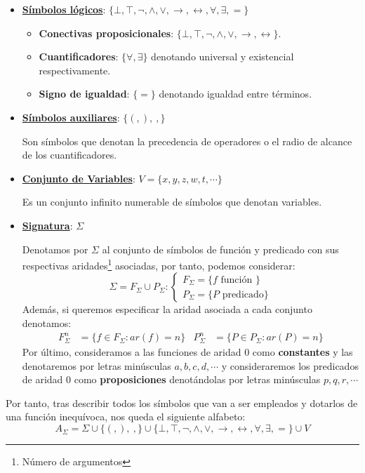 \documentclass[10pt,a4paper,openright]{book}
\begin{document}
\begin{itemize}
\item \underline{\textbf{Símbolos lógicos}}: $\{\bot, \top, \neg, \wedge, \vee, \rightarrow, \leftrightarrow, \forall, \exists, =\}$
	\begin{itemize}
	\item \textbf{Conectivas proposicionales}: $\{\bot, \top, \neg, \wedge, \vee, \rightarrow, \leftrightarrow\}$.
	\item \textbf{Cuantificadores}: $\{\forall, \exists\}$ denotando universal y existencial respectivamente.
	\item \textbf{Signo de igualdad}: $\{=\}$ denotando igualdad entre términos.
	\end{itemize}
\item \underline{\textbf{Símbolos auxiliares}}: $\{(, ), \ ,\}$

Son símbolos que denotan la precedencia de operadores o el radio de alcance de los cuantificadores.

\item \underline{\textbf{Conjunto de Variables}}: $V=\{x,y,z,w,t, \cdots\}$

Es un conjunto infinito numerable de símbolos que denotan variables.

\item \underline{\textbf{Signatura}}: $\Sigma$

Denotamos por $\Sigma$ al conjunto de símbolos de función y predicado con sus respectivas aridades\footnote{Número de argumentos} asociadas, por tanto, podemos considerar:
$$\Sigma = F_\Sigma \cup P_\Sigma: \begin{cases} F_\Sigma = \{f \mbox{ función }\} \\ P_\Sigma = \{P \mbox{ predicado}\}\end{cases}$$
Además, si queremos especificar la aridad asociada a cada conjunto denotamos:
\begin{align*}
F_\Sigma^n & = \{f\in F_\Sigma: ar(f)=n\} & P_\Sigma^n & = \{P\in P_\Sigma: ar(P)=n\}
\end{align*}
Por último, consideramos a las funciones de aridad 0 como \textbf{constantes} y las denotaremos por letras minúsculas $a,b,c,d, \cdots$ y consideraremos los predicados de aridad 0 como \textbf{proposiciones} denotándolas por letras minúsculas $p,q,r,\cdots$
\end{itemize}
Por tanto, tras describir todos los símbolos que van a ser empleados y dotarlos de una función inequívoca, nos queda el siguiente alfabeto:
$$A_\Sigma = \Sigma \cup \{(,), \ ,\}\cup \{\bot, \top, \neg, \wedge, \vee, \rightarrow, \leftrightarrow, \forall, \exists, =\}\cup V$$
\end{document}
